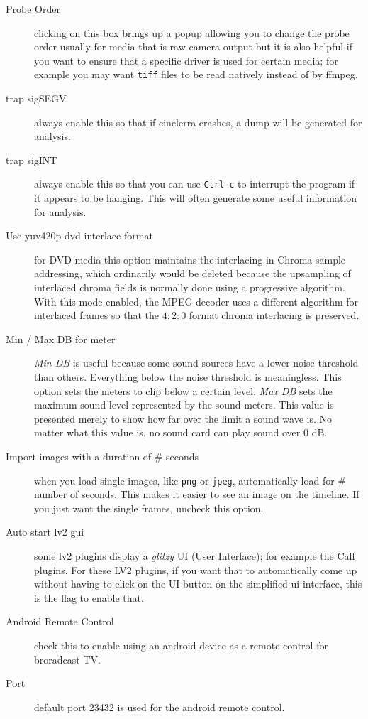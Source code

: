 \begin{description}
    \item[Probe Order] clicking on this box brings up a popup allowing you to change the probe order usually for media that is raw camera output but it is also helpful if you want to ensure that a specific driver is used for certain media; for example you may want \texttt{tiff} files to be read natively instead of by ffmpeg.
    \item[trap sigSEGV] always enable this so that if cinelerra crashes, a dump will be generated for analysis.
    \item[trap sigINT] always enable this so that you can use \texttt{Ctrl-c} to interrupt the program if it appears to be hanging.  This will often generate some useful information for analysis.
    \item[Use yuv420p dvd interlace format] for DVD media this option maintains the interlacing in Chroma sample addressing, which ordinarily would be deleted because the upsampling of interlaced chroma fields is normally done using a progressive algorithm.  With this mode enabled, the MPEG decoder uses a different algorithm for interlaced frames so that the $4:2:0$ format chroma interlacing is preserved.
    \item[Min / Max DB for meter] \textit{Min DB} is useful because some sound sources have a lower noise threshold than others. Everything below the noise threshold is meaningless. This option sets the meters to clip below a certain level.  \textit{Max DB} sets the maximum sound level represented by the sound meters. This value is presented merely to show how far over the limit a sound wave is. No matter what this value is, no sound card can play sound over 0 dB.
    \item[Import images with a duration of \# seconds] when you load single images, like \texttt{png} or \texttt{jpeg}, automatically load for \# number of seconds.  This makes it easier to see an image on the timeline.  If you just want the single frames, uncheck this option.
    \item[Auto start lv2 gui] some lv2 plugins display a \textit{glitzy} UI (User Interface); for example the Calf plugins.  For these LV2 plugins, if you want that to automatically come up without having to click on the UI button on the simplified ui interface, this is the flag to enable that.
    \item[Android Remote Control] check this to enable using an android device as a remote control for broradcast TV.
    \item[Port] default port 23432 is used for the android remote control.

\end{description}
